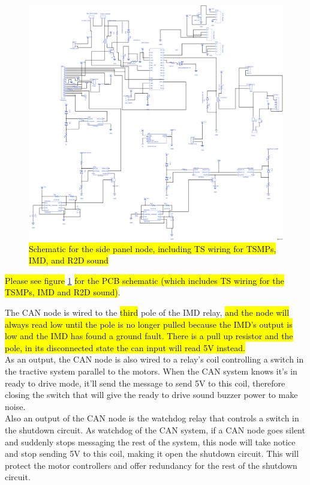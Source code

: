 \documentclass{article}
\DeclareRobustCommand{\hlr}[1]{{\sethlcolor{red}\hl{#1}}}
\begin{document}
            \begin{figure}
                \includegraphics[height= 0.7 \textheight]{Panel-Board}
                \caption{\hlr{Schematic for the side panel node, including TS wiring for TSMPs, IMD, and R2D sound}}
                \label{panelnode}
            \end{figure}

            \hlr{Please see figure} \ref{panelnode} \hlr{for the PCB schematic (which includes TS wiring for the TSMPs, IMD and R2D sound)}.

            The CAN node is wired to the \hlr{third} pole of the IMD relay, \hlr{and the node will always read low until the pole is no longer pulled because the IMD's output is low and the IMD has found a ground fault. There is a pull up resistor and the pole, in its disconnected state the can input will read 5V instead.}\\

            As an output, the CAN node is also wired to a relay's coil controlling a switch in the tractive system parallel to the motors. When the CAN system knows it's in ready to drive mode, it'll send the message to send 5V to this coil, therefore closing the switch that will give the ready to drive sound buzzer power to make noise.\\

            Also an output of the CAN node is the watchdog relay that controls a switch in the shutdown circuit. As watchdog of the CAN system, if a CAN node goes silent and suddenly stops messaging the rest of the system, this node will take notice and stop sending 5V to this coil, making it open the shutdown circuit. This will protect the motor controllers and offer redundancy for the rest of the shutdown circuit.
\end{document}
